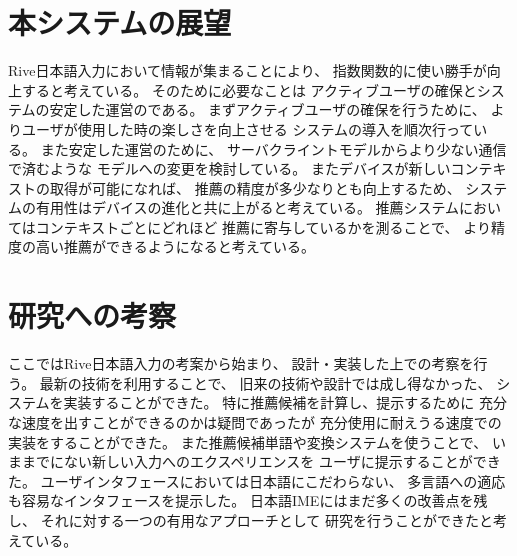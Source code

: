 \section{本システムの展望}
Rive日本語入力において情報が集まることにより、
指数関数的に使い勝手が向上すると考えている。
そのために必要なことは
アクティブユーザの確保とシステムの安定した運営のである。
まずアクティブユーザの確保を行うために、
よりユーザが使用した時の楽しさを向上させる
システムの導入を順次行っている。
また安定した運営のために、
サーバクライントモデルからより少ない通信で済むような
モデルへの変更を検討している。
またデバイスが新しいコンテキストの取得が可能になれば、
推薦の精度が多少なりとも向上するため、
システムの有用性はデバイスの進化と共に上がると考えている。
推薦システムにおいてはコンテキストごとにどれほど
推薦に寄与しているかを測ることで、
より精度の高い推薦ができるようになると考えている。

\section{研究への考察}
ここではRive日本語入力の考案から始まり、
設計・実装した上での考察を行う。
最新の技術を利用することで、
旧来の技術や設計では成し得なかった、
システムを実装することができた。
特に推薦候補を計算し、提示するために
充分な速度を出すことができるのかは疑問であったが
充分使用に耐えうる速度での実装をすることができた。
また推薦候補単語や変換システムを使うことで、
いままでにない新しい入力へのエクスペリエンスを
ユーザに提示することができた。
ユーザインタフェースにおいては日本語にこだわらない、
多言語への適応も容易なインタフェースを提示した。
日本語IMEにはまだ多くの改善点を残し、
それに対する一つの有用なアプローチとして
研究を行うことができたと考えている。
